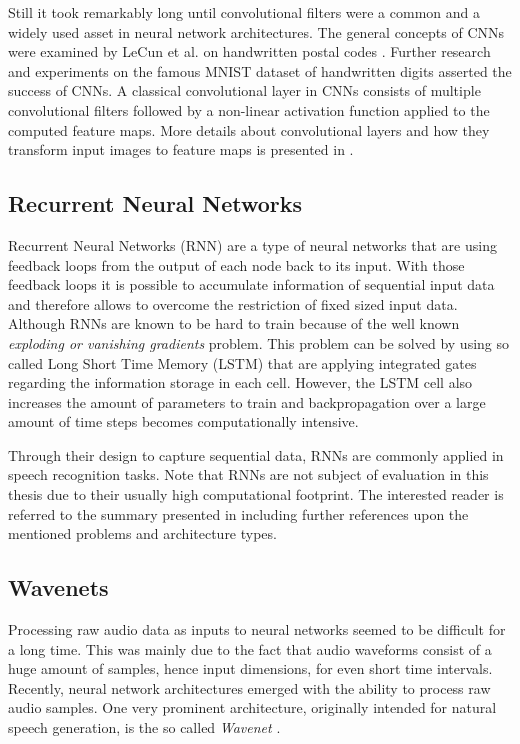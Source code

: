 Still it took remarkably long until convolutional filters were a common and a widely used asset in neural network architectures.
The general concepts of CNNs were examined by LeCun et al. on handwritten postal codes \cite{LeCun1989_Generalization}.
Further research and experiments on the famous MNIST dataset of handwritten digits \cite{LeCun1998} asserted the success of CNNs.
A classical convolutional layer in CNNs consists of multiple convolutional filters followed by a non-linear activation function applied to the computed feature maps.
More details about convolutional layers and how they transform input images to feature maps is presented in .



\subsection{Recurrent Neural Networks}\label{sec:prev_nn_rnn}
Recurrent Neural Networks (RNN) are a type of neural networks that are using feedback loops from the output of each node back to its input.
With those feedback loops it is possible to accumulate information of sequential input data and therefore allows to overcome the restriction of fixed sized input data.
Although RNNs are known to be hard to train because of the well known \emph{exploding or vanishing gradients} problem.
This problem can be solved by using so called Long Short Time Memory (LSTM) that are applying integrated gates regarding the information storage in each cell. 
However, the LSTM cell also increases the amount of parameters to train and backpropagation over a large amount of time steps becomes computationally intensive.

Through their design to capture sequential data, RNNs are commonly applied in speech recognition tasks.
Note that RNNs are not subject of evaluation in this thesis due to their usually high computational footprint.
The interested reader is referred to the summary presented in \cite{Staudenmeyer2019} including further references upon the mentioned problems and architecture types.



\subsection{Wavenets}\label{sec:prev_nn_wavenet}
Processing raw audio data as inputs to neural networks seemed to be difficult for a long time.
This was mainly due to the fact that audio waveforms consist of a huge amount of samples, hence input dimensions, for even short time intervals.
Recently, neural network architectures emerged with the ability to process raw audio samples.
One very prominent architecture, originally intended for natural speech generation, is the so called \emph{Wavenet} \cite{Oord2016}.

